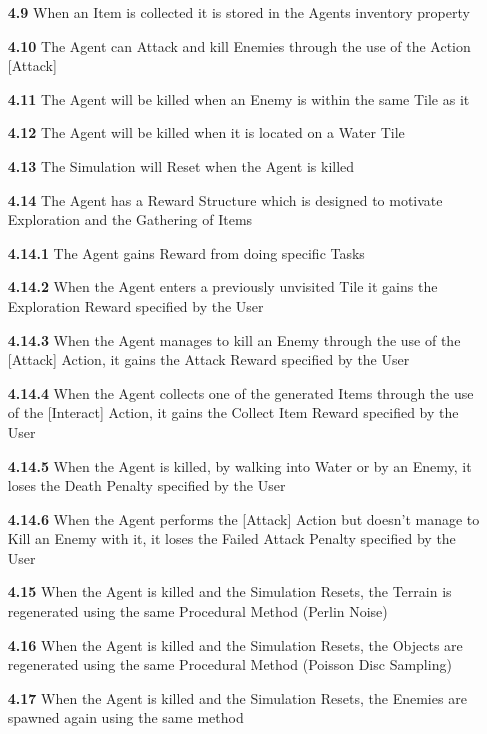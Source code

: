\begin{flushleft}
\begin{itemize}
            \item[\textbf{4.9}] When an Item is collected it is stored in the Agents \textsf{inventory} property
            \item[\textbf{4.10}] The Agent can Attack and kill Enemies through the use of the Action [Attack]
            \item[\textbf{4.11}] The Agent will be killed when an Enemy is within the same Tile as it
            \item[\textbf{4.12}] The Agent will be killed when it is located on a Water Tile
            \item[\textbf{4.13}] The Simulation will Reset when the Agent is killed
            \item[\textbf{4.14}] The Agent has a Reward Structure which is designed to motivate Exploration and the Gathering of Items 
            \item[\textbf{4.14.1}] The Agent gains Reward from doing specific Tasks
            \item[\textbf{4.14.2}] When the Agent enters a previously unvisited Tile it gains the Exploration Reward specified by the User
            \item[\textbf{4.14.3}] When the Agent manages to kill an Enemy through the use of the [Attack] Action, it gains the Attack Reward specified by the User
            \item[\textbf{4.14.4}] When the Agent collects one of the generated Items through the use of the [Interact] Action, it gains the Collect Item Reward specified by the User
            \item[\textbf{4.14.5}] When the Agent is killed, by walking into Water or by an Enemy, it loses the Death Penalty specified by the User
            \item[\textbf{4.14.6}] When the Agent performs the [Attack] Action but doesn't manage to Kill an Enemy with it, it loses the Failed Attack Penalty specified by the User
            \item[\textbf{4.15}] When the Agent is killed and the Simulation Resets, the Terrain is regenerated using the same Procedural Method (Perlin Noise)
            \item[\textbf{4.16}] When the Agent is killed and the Simulation Resets, the Objects are regenerated using the same Procedural Method (Poisson Disc Sampling)
            \item[\textbf{4.17}] When the Agent is killed and the Simulation Resets, the Enemies are spawned again using the same method

\end{itemize}
\end{flushleft}
